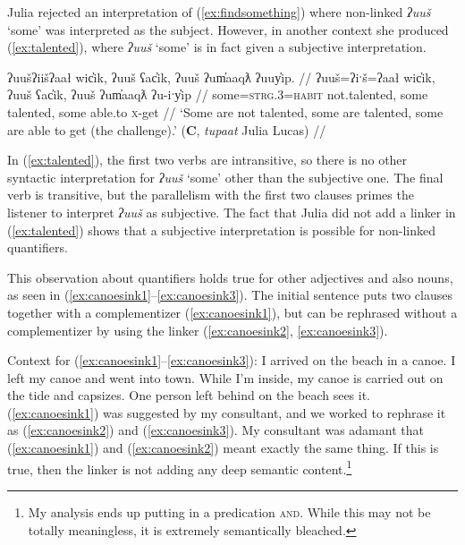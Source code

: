 Julia rejected an interpretation of (\ref{ex:findsomething}) where non-linked \textit{ʔuuš} `some' was interpreted as the subject. However, in another context she produced (\ref{ex:talented}), where \textit{ʔuuš} `some' is in fact given a subjective interpretation.

\ex \label{ex:talented}
\begingl
\glpreamble ʔuušʔiišʔaał wic̓ik, ʔuuš ʕac̓ik, ʔuuš ʔum̓aaqƛ ʔuuy̓ip. //
\gla ʔuuš=ʔiˑš=ʔaał wic̓ik, ʔuuš ʕac̓ik, ʔuuš ʔum̓aaqƛ ʔu-iˑy̓ip //
\glb some=\textsc{strg.3}=\textsc{habit} not.talented, some talented, some able.to \textsc{x}-get //
\glft ‘Some are not talented, some are talented, some are able to get (the challenge).’ (\textbf{C}, \textit{tupaat} Julia Lucas) //
\endgl
\xe

In (\ref{ex:talented}), the first two verbs are intransitive, so there is no other syntactic interpretation for \textit{ʔuuš} `some' other than the subjective one. The final verb is transitive, but the parallelism with the first two clauses primes the listener to interpret \textit{ʔuuš} as subjective. The fact that Julia did not add a linker in (\ref{ex:talented}) shows that a subjective interpretation is possible for non-linked quantifiers. %

This observation about quantifiers holds true for other adjectives and also nouns, as seen in (\ref{ex:canoesink1}--\ref{ex:canoesink3}). The initial sentence puts two clauses together with a complementizer (\ref{ex:canoesink1}), but can be rephrased without a complementizer by using the linker (\ref{ex:canoesink2}, \ref{ex:canoesink3}).

\vspace{5pt}

\noindent Context for (\ref{ex:canoesink1}--\ref{ex:canoesink3}): I arrived on the beach in a canoe. I left my canoe and went into town. While I'm inside, my canoe is carried out on the tide and capsizes. One person left behind on the beach sees it. (\ref{ex:canoesink1}) was suggested by my consultant, and we worked to rephrase it as (\ref{ex:canoesink2}) and (\ref{ex:canoesink3}). My consultant was adamant that (\ref{ex:canoesink1}) and (\ref{ex:canoesink2}) meant exactly the same thing. If this is true, then the linker is not adding any deep semantic content.\footnote{My analysis ends up putting in a predication \textsc{and}. While this may not be totally meaningless, it is extremely semantically bleached.}

